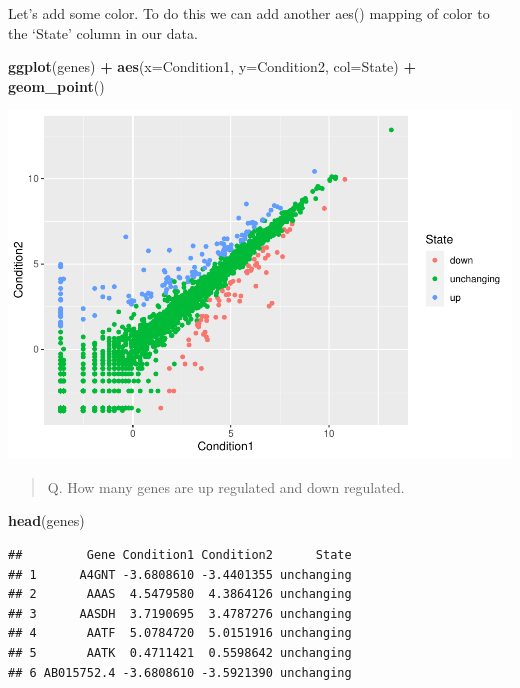 \documentclass[
]{article}
\newenvironment{Shaded}{\begin{snugshade}}{\end{snugshade}}
\newcommand{\DataTypeTok}[1]{\textcolor[rgb]{0.13,0.29,0.53}{#1}}
\newcommand{\KeywordTok}[1]{\textcolor[rgb]{0.13,0.29,0.53}{\textbf{#1}}}
\newcommand{\NormalTok}[1]{#1}
\newcommand{\OperatorTok}[1]{\textcolor[rgb]{0.81,0.36,0.00}{\textbf{#1}}}
\newcommand{\StringTok}[1]{\textcolor[rgb]{0.31,0.60,0.02}{#1}}
\begin{document}
Let's add some color. To do this we can add another aes() mapping of
color to the `State' column in our data.

\begin{Shaded}
\begin{Highlighting}[]
\KeywordTok{ggplot}\NormalTok{(genes) }\OperatorTok{+}
\StringTok{  }\KeywordTok{aes}\NormalTok{(}\DataTypeTok{x=}\NormalTok{Condition1, }\DataTypeTok{y=}\NormalTok{Condition2, }\DataTypeTok{col=}\NormalTok{State) }\OperatorTok{+}\StringTok{ }
\StringTok{  }\KeywordTok{geom_point}\NormalTok{() }
\end{Highlighting}
\end{Shaded}

\includegraphics{class05_files/figure-latex/unnamed-chunk-9-1.pdf}

\begin{quote}
Q. How many genes are up regulated and down regulated.
\end{quote}

\begin{Shaded}
\begin{Highlighting}[]
\KeywordTok{head}\NormalTok{(genes)}
\end{Highlighting}
\end{Shaded}

\begin{verbatim}
##         Gene Condition1 Condition2      State
## 1      A4GNT -3.6808610 -3.4401355 unchanging
## 2       AAAS  4.5479580  4.3864126 unchanging
## 3      AASDH  3.7190695  3.4787276 unchanging
## 4       AATF  5.0784720  5.0151916 unchanging
## 5       AATK  0.4711421  0.5598642 unchanging
## 6 AB015752.4 -3.6808610 -3.5921390 unchanging
\end{verbatim}
\end{document}

